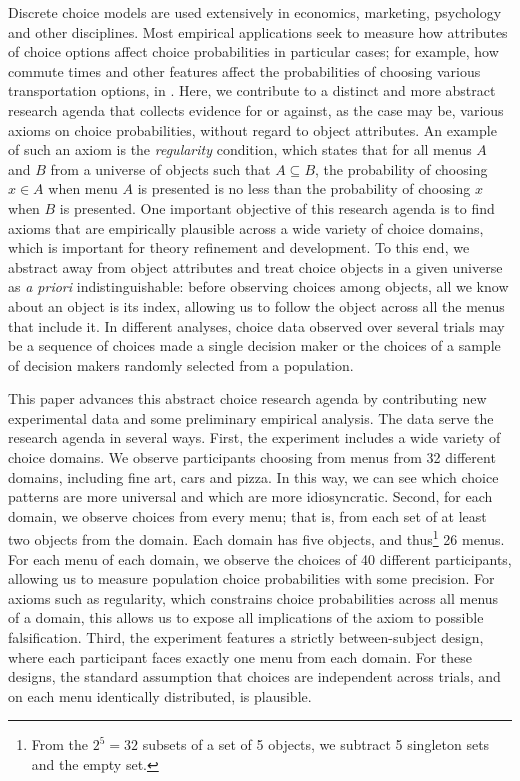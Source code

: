 \documentclass[11pt,letter]{article}
\newcommand{\menu}{menu}
\newcommand{\menus}{menus}
\begin{document}
Discrete choice models are used extensively in economics, marketing, psychology and other disciplines.
Most empirical applications seek to measure how attributes of choice options affect choice probabilities in particular cases; for example, how commute times and other features affect the probabilities of choosing various transportation options, in .
Here, we contribute to a distinct and more abstract research agenda that collects evidence for or against, as the case may be, various axioms on choice probabilities, without regard to object attributes.
An example of such an axiom is the {\em regularity} condition, which states that for all \menus{} $A$ and $B$ from a universe of objects such that $A \subseteq B$, the probability of choosing $x \in A$ when \menu{} $A$ is presented is no less than the probability of choosing $x$ when $B$ is presented.
One important objective of this research agenda is to find axioms that are empirically plausible across a wide variety of choice domains, which is important for theory refinement and development.
To this end, we abstract away from object attributes and treat choice objects in a given universe as {\em a priori} indistinguishable: before observing choices among objects, all we know about an object is its index, allowing us to follow the object across all the \menus{} that include it.
In different analyses, choice data observed over several trials may be a sequence of choices made a single decision maker or the choices of a sample of decision makers randomly selected from a population.

This paper advances this abstract choice research agenda by contributing new experimental data and some preliminary empirical analysis.
The data serve the research agenda in several ways.
First, the experiment includes a wide variety of choice domains.
We observe participants choosing from \menus{} from 32 different domains, including fine art, cars and pizza.
In this way, we can see which choice patterns are more universal and which are more idiosyncratic.
Second, for each domain, we observe choices from every \menu{}; that is, from each set of at least two objects from the domain.
Each domain has five objects, and thus\footnote{From the $2^5 = 32$ subsets of a set of 5 objects, we subtract 5 singleton sets and the empty set.} 26 \menus{}.
For each \menu{} of each domain, we observe the choices of 40 different participants, allowing us to measure population choice probabilities with some precision.
For axioms such as regularity, which constrains choice probabilities across all \menus{} of a domain, this allows us to expose all implications of the axiom to possible falsification.
Third, the experiment features a strictly between-subject design, where each participant faces exactly one \menu{} from each domain.
For these designs, the standard assumption that choices are independent across trials, and on each \menu{} identically distributed, is plausible.
\end{document}
